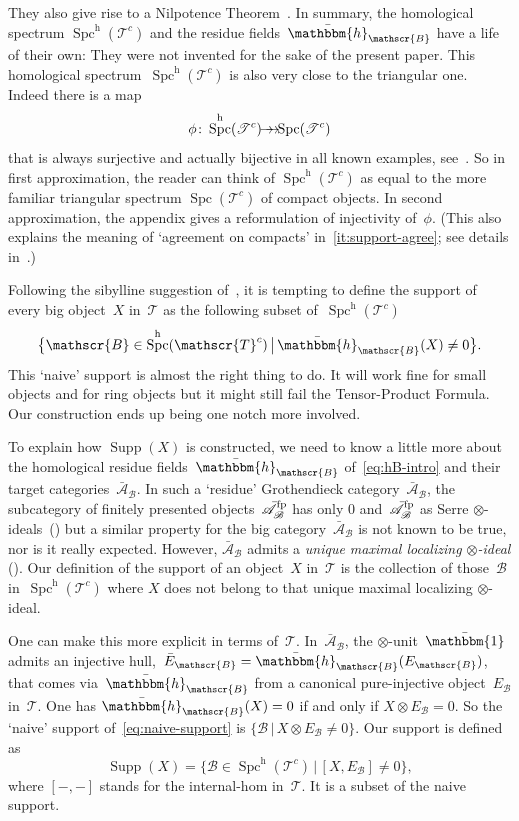 \documentclass[JEP,XML,SOM,Unicode]{cedram}
\newcommand{\onto}{\mathchoice{\to\hspace*{-5mm}\to}{\to\hspace*{-2.85mm}\to}{\to\hspace*{-3mm}\to}{\to\hspace*{-3mm}\to}}
\numberwithin{equation}{section}
\theoremstyle{definition}
\DeclareMathOperator{\Spc}{Spc}
\newcommand{\cat}[1]{\mathscr{#1}}
\newcommand{\SET}[2]{\big\{#1\,\big|\,#2\big\}}
\newcommand{\unit}{\mathbbm{1}}
\newcommand{\smallh}{\mathrm{h}}
\DeclareMathOperator{\Supp}{Supp}
\newcommand{\AB}{\bar{\cA}_{\cB}}
\newcommand{\bEB}{\bar E_{\cB}}
\newcommand{\boneda}{\bar\yoneda}
\newcommand{\bunit}{\bar\unit}
\newcommand{\cA}{\cat{A}}
\newcommand{\cB}{\cat{B}}
\newcommand{\cT}{\cat{T}}
\newcommand{\EB}{E_{\cB}}
\newcommand{\fp}{^{\textup{fp}}}
\newcommand{\hB}{\boneda_{\cB}}
\newcommand{\SpchT}{\Spch(\cat{T}^c)}
\newcommand{\Spch}{\Spc^{\smallh}}
\newcommand{\SpcT}{\Spc(\cat{T}^c)}
\newcommand{\tensids}{$\otimes$\nobreakdash-ideals}
\newcommand{\tensid}{$\otimes$\nobreakdash-ideal}
\newcommand{\yoneda}{\mathbbm{h}}
\begin{document}
They also give rise to a Nilpotence Theorem~\cite[Th.\,1.1]{Balmer20a}. In summary, the homological spectrum $\SpchT$ and the residue fields~$\hB$ have a life of their own: They were not invented for the sake of the present paper. This homological spectrum~$\SpchT$ is also very close to the triangular one. Indeed there is a map
\begin{equation}
\label{eq:phi}
\phi\colon\SpchT\onto \SpcT
\end{equation}
that is always surjective and actually bijective in all known examples, see~\hbox{\cite[\S5]{Balmer20a}}. So in first approximation, the reader can think of $\SpchT$ as equal to the more familiar triangular spectrum $\SpcT$ of compact objects. In second approximation, the appendix gives a reformulation of injectivity of~$\phi$. (This also explains the meaning of `agreement on compacts' in \,\eqref{it:support-agree}; see details in~.)

Following the sibylline suggestion of~\cite[Rem.\,4.6]{Balmer20a}, it is tempting to define the support of every big object~$X$ in~$\cT$ as the following subset of~$\SpchT$
\begin{equation}
\label{eq:naive-support}
\SET{\cB\in\SpchT}{\hB(X)\neq 0}.
\end{equation}
This `naive' support is almost the right thing to do. It will work fine for small objects and for ring objects but it might still fail the Tensor-Product Formula. Our construction ends up being one notch more involved.

To explain how $\Supp(X)$ is constructed, we need to know a little more about the homological residue fields~$\hB$ of~\eqref{eq:hB-intro} and their target categories~$\AB$. In such a `residue' Grothendieck category~$\AB$, the subcategory of finitely presented objects~$\AB\fp$ has only $0$ and~$\AB\fp$ as Serre \tensids\ () but a similar property for the big category~$\AB$ is not known to be true, nor is it really expected. However, $\AB$ admits a \emph{unique maximal localizing \tensid} (). Our definition of the support of an object~$X$ in~$\cT$ is the collection of those~$\cB$ in~$\SpchT$ where $X$ does not belong to that unique maximal localizing \tensid.

One can make this more explicit in terms of~$\cT$. In~$\AB$, the $\otimes$-unit~$\bunit$ admits an injective hull,~$\bEB=\hB(\EB)$, that comes via~$\hB$ from a canonical pure-injective object~$\EB$ in~$\cT$. One has $\hB(X)=0$ if and only if $X\otimes \EB=0$. So the `naive' support of~\eqref{eq:naive-support} is $\SET{\cB}{X\otimes\EB\neq0}$. Our support is defined as
\begin{equation}
\label{eq:Supp}
\Supp(X)=\SET{\cB\in\SpchT}{[X,\EB]\neq0},
\end{equation}
where $[-,-]$ stands for the internal-hom in~$\cT$. It is a subset of the naive support.
\end{document}
